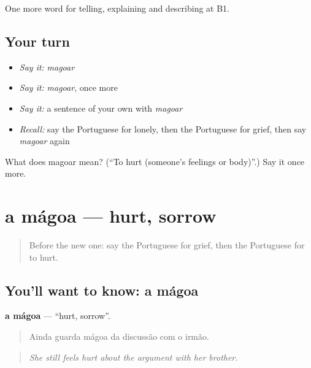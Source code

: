 \begin{grammarlens}[title={What you've built}]
One more word for telling, explaining and describing at B1.
\end{grammarlens}

\subsection*{Your turn}
\begin{itemize}
\raggedright
  \item \emph{Say it:} \emph{magoar}
  \item \emph{Say it:} \emph{magoar}, once more
  \item \emph{Say it:} a sentence of your own with \emph{magoar}
  \item \emph{Recall:} say the Portuguese for lonely, then the Portuguese for grief, then say \emph{magoar} again
\end{itemize}

\begin{tcolorbox}[breakable,colback=teal!4,colframe=teal!35!black,title={Before you move on}]
What does magoar mean? (\textquotedblleft{}To hurt (someone's feelings or body)\textquotedblright{}.) Say it once more.
\end{tcolorbox}
\section[a mágoa]{a mágoa — hurt, sorrow}

\label{lesson:PT-C479-magoa}



\begin{quote}
Before the new one: say the Portuguese for grief, then the Portuguese for to hurt.
\end{quote}

\subsection*{You'll want to know: a mágoa}
\textbf{a mágoa} — \textquotedblleft{}hurt, sorrow\textquotedblright{}.

\begin{quote}
Ainda guarda mágoa da discussão com o irmão.
\end{quote}

\begin{quote}
\emph{She still feels hurt about the argument with her brother.}
\end{quote}

